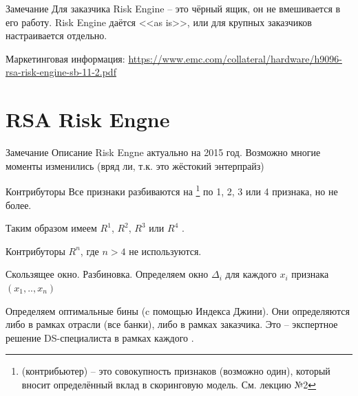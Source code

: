 \begin{frame}
	\begin{block}{Замечание}
		Для заказчика Risk Engine -- это чёрный ящик,
		он не вмешивается в его работу. 
		Risk Engine даётся <<as is>>, 
		или для крупных заказчиков настраивается отдельно.
	\end{block}
	\small
	Маркетинговая информация: \url{https://www.emc.com/collateral/hardware/h9096-rsa-risk-engine-sb-11-2.pdf}
\end{frame}

\begin{frame}
	
\end{frame}


\section{RSA Risk Engne}\label{section:risk_engine}

\begin{frame}
	\begin{block}{Замечание}
	Описание Risk Engne актуально на 2015 год. Возможно многие моменты изменились 
	(вряд ли, т.к. это жёстокий энтерпрайз)
	\end{block}
\end{frame}


\begin{frame}{Контрибуторы}
	Все признаки разбиваются на 
	\footnote{ (контрибьютер) -- это совокупность признаков (возможно один),
	который вносит определённый вклад в скоринговую модель. См. лекцию №2}
	по 1, 2, 3 или 4 признака, но не более. 
	
	Таким образом имеем $R^1$, $R^2$, $R^3$ или $R^4$ .
	
	Контрибуторы $R^n$, где $n>4$ не используются.	
\end{frame}

\begin{frame}{Скользящее окно. Разбиновка.}
	\footnotesize
	Определяем окно $\Delta_i$ для каждого $x_i$ признака 
	$(x_1, .., x_n)$
	\begin{center}
		\begin{tikzpicture}[scale=1.5]
			
		\end{tikzpicture}
	\end{center}
	Определяем оптимальные бины (c помощью Индекса Джини).
	Они определяются либо в рамках отрасли (все банки), либо в рамках заказчика.
	Это -- экспертное решение DS-специалиста в рамках каждого .
\end{frame}

